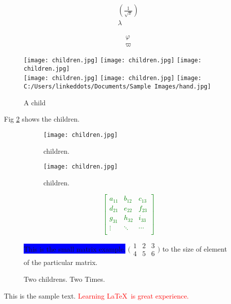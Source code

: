 \documentclass[12pt]{book}
\begin{document}

\begin{align*}
\left(\frac{1}{\sqrt{x}}\right)\\
\lambda
\end{align*}

\newpage

\begin{align*}
\varphi\\
\varpi
\end{align*}


\newpage

\begin{figure}

\texttt{[image: children.jpg]}\quad
\texttt{[image: children.jpg]}\quad
\texttt{[image: children.jpg]}
\\[\baselineskip]
\texttt{[image: children.jpg]}\quad
\texttt{[image: children.jpg]}\quad
\texttt{[image: C:/Users/linkeddots/Documents/Sample Images/hand.jpg]}

\caption{A child}
\label{fig:children}
\end{figure}
Fig \ref{fig:children} shows the children.

\newpage
\begin{figure}[h!]
\centering
\begin{subfigure}[b]{0.4\linewidth}
   \texttt{[image: children.jpg]}
    \caption{children.}
\end{subfigure}

\begin{subfigure}[b]{0.4\linewidth}
   \texttt{[image: children.jpg]}
    \caption{children.}
\end{subfigure}

\caption{Two childrens. Two Times.}
\label{fig:children}

\newpage
\textcolor{green}{\[
\begin{bmatrix}
 a_{11} & b_{12} & c_{13}\\
 d_{21} & e_{22} & f_{23}\\
 g_{31} & h_{32} & i_{33}\\
 \vdots & \ddots & \cdots\\
\end{bmatrix}
\]}

\colorbox{blue}{This is the small matrix example.} $\bigl(\begin{smallmatrix} 1 & 2 & 3\\
4 & 5 & 6
\end{smallmatrix}\bigr)$ to the size of element of \color{pink}the particular matrix.

\end{figure}
This is the sample text.
\textcolor{red} {Learning \LaTeX\ is great experience.} \\ %
\end{document}
